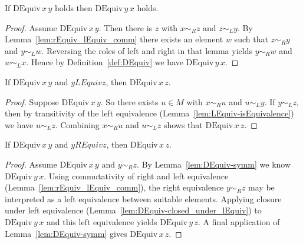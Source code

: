 \begin{lemma}
\label{lem:DEquiv-symm}
If \(\mathrm{DEquiv}\,x\,y\) holds then \(\mathrm{DEquiv}\,y\,x\) holds.
\leanok
{}
\end{lemma}
\begin{proof}
\leanok
Assume \(\mathrm{DEquiv}\,x\,y\).  Then there is \(z\) with \(x \sim_R z\) and \(z \sim_L y\).  By Lemma~\ref{lem:rEquiv_lEquiv_comm} there exists an element \(w\) such that \(z \sim_R y\) and \(y \sim_L w\).  Reversing the roles of left and right in that lemma yields \(y \sim_R w\) and \(w \sim_L x\).  Hence by Definition~\ref{def:DEquiv} we have \(\mathrm{DEquiv}\,y\,x\).
\end{proof}

\begin{lemma}
\label{lem:DEquiv-closed_under_lEquiv}
If \(\mathrm{DEquiv}\,x\,y\) and \(y \mathrel{LEquiv} z\), then \(\mathrm{DEquiv}\,x\,z\).
\leanok
{}
\end{lemma}
\begin{proof}
\leanok
Suppose \(\mathrm{DEquiv}\,x\,y\).  So there exists \(u\in M\) with \(x \sim_R u\) and \(u \sim_L y\).  If \(y \sim_L z\), then by transitivity of the left equivalence (Lemma~\ref{lem:LEquiv-isEquivalence}) we have \(u \sim_L z\).  Combining \(x \sim_R u\) and \(u \sim_L z\) shows that \(\mathrm{DEquiv}\,x\,z\).
\end{proof}

\begin{lemma}
\label{lem:DEquiv-closed_under_rEquiv}
If \(\mathrm{DEquiv}\,x\,y\) and \(y \mathrel{REquiv} z\), then \(\mathrm{DEquiv}\,x\,z\).
\leanok
{}
\end{lemma}
\begin{proof}
\leanok
Assume \(\mathrm{DEquiv}\,x\,y\) and \(y \sim_R z\).  By Lemma~\ref{lem:DEquiv-symm} we know \(\mathrm{DEquiv}\,y\,x\).  Using commutativity of right and left equivalence (Lemma~\ref{lem:rEquiv_lEquiv_comm}), the right equivalence \(y \sim_R z\) may be interpreted as a left equivalence between suitable elements.  Applying closure under left equivalence (Lemma~\ref{lem:DEquiv-closed_under_lEquiv}) to \(\mathrm{DEquiv}\,y\,x\) and this left equivalence yields \(\mathrm{DEquiv}\,y\,z\).  A final application of Lemma~\ref{lem:DEquiv-symm} gives \(\mathrm{DEquiv}\,x\,z\).
\end{proof}

